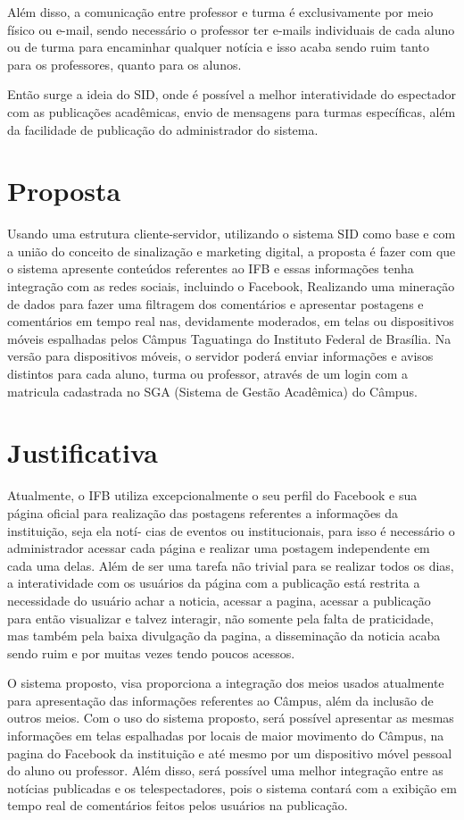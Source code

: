 Além disso, a comunicação entre professor e turma é exclusivamente por meio físico ou e-mail, sendo necessário o professor ter e-mails individuais de cada aluno ou de turma para encaminhar qualquer notícia e isso acaba sendo ruim tanto para os professores, quanto para os alunos. 

Então surge a ideia do SID, onde é possível a melhor interatividade do espectador com as publicações acadêmicas, envio de mensagens para turmas específicas, além da facilidade de publicação do administrador do sistema.

\section{Proposta}
Usando uma estrutura cliente-servidor, utilizando o sistema SID como base e com a união do conceito de sinalização e marketing digital, a proposta é fazer com que o sistema apresente conteúdos referentes ao IFB e essas informações tenha integração com as redes sociais, incluindo o Facebook, Realizando uma mineração de dados para fazer uma filtragem dos comentários e apresentar postagens e comentários em tempo real nas, devidamente moderados, em telas ou dispositivos móveis espalhadas pelos Câmpus Taguatinga do Instituto Federal de Brasília. Na versão para dispositivos móveis, o servidor poderá enviar informações e avisos distintos para cada aluno, turma ou professor, através de um login com a matricula cadastrada no SGA (Sistema de Gestão Acadêmica) do Câmpus.

\section{Justificativa}
Atualmente, o IFB utiliza excepcionalmente o seu perfil do Facebook e sua página
oficial para realização das postagens referentes a informações da instituição, seja ela notí-
cias de eventos ou institucionais, para isso é necessário o administrador acessar cada página
e realizar uma postagem independente em cada uma delas. Além de ser uma tarefa não
trivial para se realizar todos os dias, a interatividade com os usuários da página com a
publicação está restrita a necessidade do usuário achar a noticia, acessar a pagina, acessar
a publicação para então visualizar e talvez interagir, não somente pela falta de praticidade,
mas também pela baixa divulgação da pagina, a disseminação da noticia acaba
sendo ruim e por muitas vezes tendo poucos acessos.

O sistema proposto, visa proporciona a integração dos meios usados atualmente
para apresentação das informações referentes ao Câmpus, além da inclusão de outros
meios. Com o uso do sistema proposto, será possível apresentar as mesmas informações
em telas espalhadas por locais de maior movimento do Câmpus, na pagina do Facebook
da instituição e até mesmo por um dispositivo móvel pessoal do aluno ou professor. Além
disso, será possível uma melhor integração entre as notícias publicadas e os telespectadores,
pois o sistema contará com a exibição em tempo real de comentários feitos pelos
usuários na publicação.


